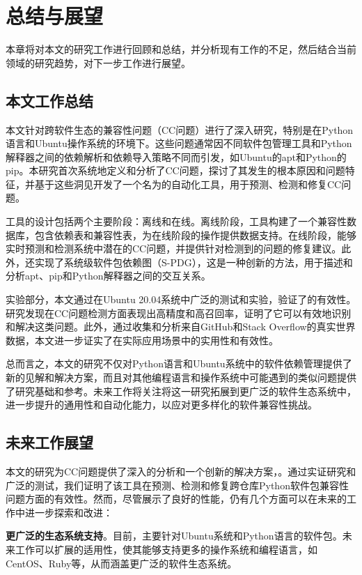 \chapter{总结与展望}
本章将对本文的研究工作进行回顾和总结，并分析现有工作的不足，然后结合当前领域的研究趋势，对下一步工作进行展望。
\section{本文工作总结}
本文针对跨软件生态的兼容性问题（CC问题）进行了深入研究，特别是在Python语言和Ubuntu操作系统的环境下。这些问题通常因不同软件包管理工具和Python解释器之间的依赖解析和依赖导入策略不同而引发，如Ubuntu的apt和Python的pip。本研究首次系统地定义和分析了CC问题，探讨了其发生的根本原因和问题特征，并基于这些洞见开发了一个名为\tool{}的自动化工具，用于预测、检测和修复CC问题。

\tool{}工具的设计包括两个主要阶段：离线和在线。离线阶段，工具构建了一个兼容性数据库，包含依赖表和兼容性表，为在线阶段的操作提供数据支持。在线阶段，\tool{}能够实时预测和检测系统中潜在的CC问题，并提供针对检测到的问题的修复建议。此外，\tool{}还实现了系统级软件包依赖图（S-PDG），这是一种创新的方法，用于描述和分析apt、pip和Python解释器之间的交互关系。

实验部分，本文通过在Ubuntu 20.04系统中广泛的测试和实验，验证了\tool{}的有效性。研究发现\tool{}在CC问题检测方面表现出高精度和高召回率，证明了它可以有效地识别和解决这类问题。此外，通过收集和分析来自GitHub和Stack Overflow的真实世界数据，本文进一步证实了\tool{}在实际应用场景中的实用性和有效性。

总而言之，本文的研究不仅对Python语言和Ubuntu系统中的软件依赖管理提供了新的见解和解决方案，而且对其他编程语言和操作系统中可能遇到的类似问题提供了研究基础和参考。未来工作将关注将这一研究拓展到更广泛的软件生态系统中，进一步提升\tool{}的通用性和自动化能力，以应对更多样化的软件兼容性挑战。
\section{未来工作展望}
本文的研究为CC问题提供了深入的分析和一个创新的解决方案，\tool{}。通过实证研究和广泛的测试，我们证明了该工具在预测、检测和修复跨仓库Python软件包兼容性问题方面的有效性。然而，尽管\tool{}展示了良好的性能，仍有几个方面可以在未来的工作中进一步探索和改进：

\textbf{更广泛的生态系统支持}。目前，\tool{}主要针对Ubuntu系统和Python语言的软件包。未来工作可以扩展\tool{}的适用性，使其能够支持更多的操作系统和编程语言，如CentOS、Ruby等，从而涵盖更广泛的软件生态系统。


